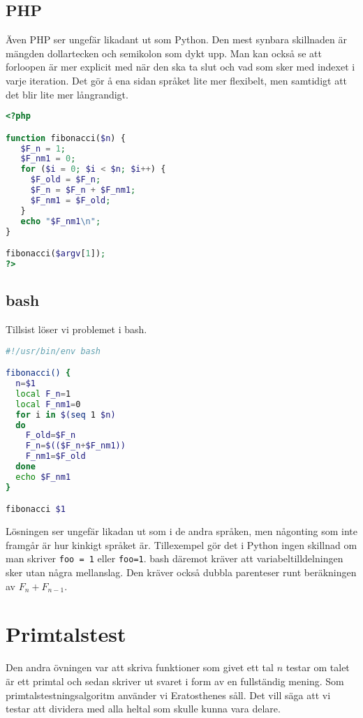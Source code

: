 \documentclass[10pt, twoside,a4paper]{article}
\begin{document}
\subsection{PHP}
Även PHP ser ungefär likadant ut som Python. Den mest synbara skillnaden är mängden dollartecken och semikolon som dykt upp. Man kan också se att forloopen är mer explicit med när den ska ta slut och vad som sker med indexet i varje iteration. Det gör å ena sidan språket lite mer flexibelt, men samtidigt att det blir lite mer långrandigt.
\begin{lstlisting}[language=PHP]
<?php

function fibonacci($n) {
   $F_n = 1;
   $F_nm1 = 0;
   for ($i = 0; $i < $n; $i++) {
     $F_old = $F_n;
     $F_n = $F_n + $F_nm1;
     $F_nm1 = $F_old;
   }
   echo "$F_nm1\n";
}

fibonacci($argv[1]);
?>
\end{lstlisting}

\newpage
\subsection{bash}
Tillsist löser vi problemet i bash.
\begin{lstlisting}[language=bash]
#!/usr/bin/env bash

fibonacci() {
  n=$1
  local F_n=1
  local F_nm1=0
  for i in $(seq 1 $n)
  do
    F_old=$F_n
    F_n=$(($F_n+$F_nm1))
    F_nm1=$F_old
  done
  echo $F_nm1
}

fibonacci $1
\end{lstlisting}
Lösningen ser ungefär likadan ut som i de andra språken, men någonting som inte framgår är hur kinkigt språket är. Tillexempel gör det i Python ingen skillnad om man skriver \verb+foo = 1+ eller \verb+foo=1+. bash däremot kräver att variabeltilldelningen sker utan några mellanslag. Den kräver också dubbla parenteser runt beräkningen av $F_n + F_{n-1}$.

\newpage
\section{Primtalstest}
Den andra övningen var att skriva funktioner som givet ett tal $n$ testar om talet är ett primtal och sedan skriver ut svaret i form av en fullständig mening. Som primtalstestningsalgoritm använder vi Eratosthenes såll. Det vill säga att vi testar att dividera med alla heltal som skulle kunna vara delare.
\end{document}

